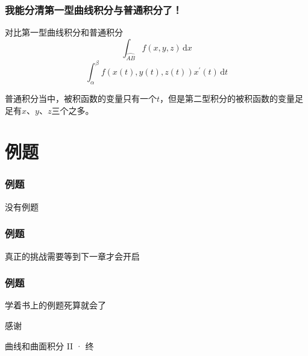 \documentclass[xetex]{beamer}
\begin{document}
    \begin{frame}
        \frametitle{我能分清第一型曲线积分与普通积分了！}
    
        对比第一型曲线积分和普通积分
        $$\int_{\wideparen{AB}}f(x,y,z)\,\mathrm{d}x$$\pause
        $$\int_\alpha^\beta f\left(x(t),y(t),z(t)\right)x^\prime(t)\,\mathrm{d}t$$\pause

        普通积分当中，被积函数的变量只有一个$t$，但是第二型积分的被积函数的变量足足有$x$、$y$、$z$三个之多。
    
    \end{frame}

    \section{例题}

    \begin{frame}
        \frametitle{例题}
        \centering
        没有例题
    
    \end{frame}

    \begin{frame}
        \frametitle{例题}
        \centering
        真正的挑战需要等到下一章才会开启
    
    \end{frame}

    \begin{frame}
        \frametitle{例题}
        \centering
        学着书上的例题死算就会了
    
    \end{frame}

    \begin{frame}[standout]
    
        感谢

        \small{曲线和曲面积分 II · 终}
    
    \end{frame}
\end{document}

